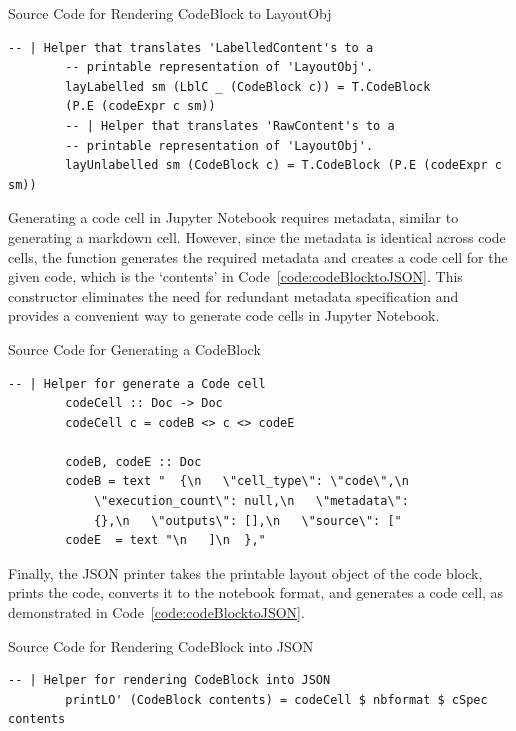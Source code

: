 \begin{listing}[h!]
	\caption{Source Code for Rendering CodeBlock to LayoutObj}
	\label{code:codeBlocktoLayObj}
	\begin{lstlisting}[language=haskell1]
		-- | Helper that translates 'LabelledContent's to a 
		-- printable representation of 'LayoutObj'.
		layLabelled sm (LblC _ (CodeBlock c)) = T.CodeBlock 
		(P.E (codeExpr c sm))
		-- | Helper that translates 'RawContent's to a 
		-- printable representation of 'LayoutObj'.
		layUnlabelled sm (CodeBlock c) = T.CodeBlock (P.E (codeExpr c sm))
	\end{lstlisting}
\end{listing}

Generating a code cell in Jupyter Notebook requires metadata, similar to 
generating a markdown cell. However, since the metadata is identical across 
code cells, the  function generates the required metadata and 
creates a code cell for the given code, which is the `contents' in 
Code~\ref{code:codeBlocktoJSON}. This constructor eliminates the need for 
redundant metadata specification and provides a convenient way to generate code 
cells in Jupyter Notebook.

\begin{listing}[h!]
	\caption{Source Code for Generating a CodeBlock}
	\label{code:codeBlock}
	\begin{lstlisting}[language=haskell1]		
		-- | Helper for generate a Code cell
		codeCell :: Doc -> Doc
		codeCell c = codeB <> c <> codeE
		
		codeB, codeE :: Doc
		codeB = text "  {\n   \"cell_type\": \"code\",\n   
			\"execution_count\": null,\n   \"metadata\": 
			{},\n   \"outputs\": [],\n   \"source\": [" 
		codeE  = text "\n   ]\n  },"
		\end{lstlisting}
\end{listing}

Finally, the JSON printer takes the printable layout object of the code block, 
prints the code, converts it to the notebook format, and generates a code cell, 
as demonstrated in Code~\ref{code:codeBlocktoJSON}.

\begin{listing}[h!]
	\caption{Source Code for Rendering CodeBlock into JSON}
	\label{code:codeBlocktoJSON}
	\begin{lstlisting}[language=haskell1]
		-- | Helper for rendering CodeBlock into JSON
		printLO' (CodeBlock contents) = codeCell $ nbformat $ cSpec contents
	\end{lstlisting}
\end{listing}

